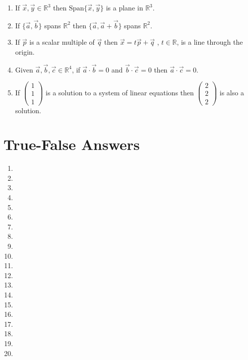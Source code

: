 \documentclass[12pt]{book}
\begin{document}
\begin{enumerate}
\begin{enumerate}
\item If $\vec{x}, \vec{y} \in \mathbb{R}^3$ then $\textrm{Span}\{ \vec{x}, \vec{y}\}$ is a plane in $\mathbb{R}^3$.
\item If $\{ \vec{a}, \vec{b} \}$ spans $\mathbb{R}^2$ then $\{ \vec{a}, \vec{a}+\vec{b} \}$ spans $\mathbb{R}^2$.
\item If $\vec{p}$ is a scalar multiple of $\vec{q}$ then $\vec{x} = t \vec{p} + \vec{q}$ , $t \in \mathbb{R}$, is a line through the origin.
\item Given $\vec{a}, \vec{b}, \vec{c} \in \mathbb{R}^4$, if $\vec{a} \cdot \vec{b} = 0$ and $\vec{b} \cdot \vec{c} = 0$ then $\vec{a} \cdot \vec{c} = 0$. 
\item If $\left(\begin{smallmatrix} 1 \\ 1 \\ 1 \end{smallmatrix}\right)$ is a solution to a system of linear equations then $\left(\begin{smallmatrix} 2 \\ 2 \\ 2 \end{smallmatrix}\right)$ is also a solution. 
\end{enumerate}

\newpage

\section*{True-False Answers}

\begin{enumerate}
\item
\item
\item
\item
\item
\item
\item
\item
\item
\item
\item
\item
\item
\item
\item
\item
\item
\item
\item
\item
\end{enumerate}


\end{enumerate}
\end{document}

